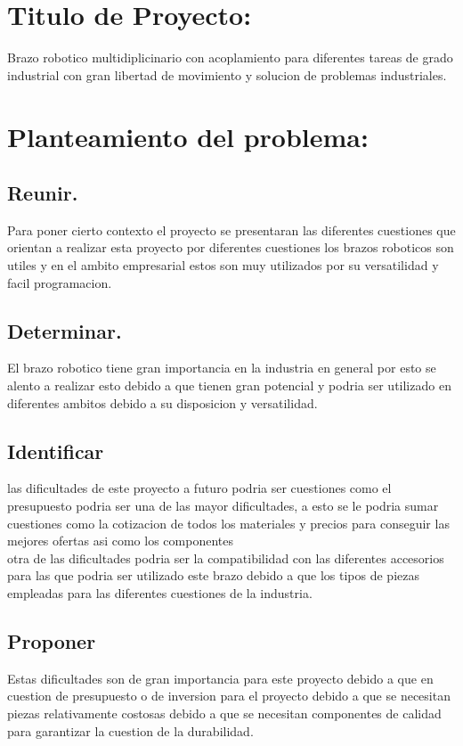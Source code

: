 \documentclass[14pt,a4paper]{article}
\begin{document}
\newpage

\section{Titulo de Proyecto:}

Brazo robotico multidiplicinario con acoplamiento para diferentes tareas de grado industrial con gran libertad de movimiento y solucion de problemas industriales.


\section{Planteamiento del problema:}

\subsection{Reunir.}
Para poner cierto contexto el proyecto se presentaran las diferentes cuestiones que orientan a realizar esta proyecto  por diferentes cuestiones los brazos roboticos son utiles y en el ambito empresarial estos son muy utilizados por su versatilidad y facil programacion.

\subsection{Determinar.}
El brazo robotico tiene gran importancia en la industria en general por esto se alento a realizar esto debido a que tienen gran potencial y podria ser utilizado en diferentes ambitos debido a su disposicion y versatilidad.

\subsection{Identificar}
las dificultades de este proyecto a futuro podria ser cuestiones como el presupuesto podria ser una de las mayor dificultades, a esto se le podria sumar cuestiones como la cotizacion de todos los materiales y precios para conseguir las mejores ofertas asi como los componentes\\
otra de las dificultades podria ser la compatibilidad con las diferentes accesorios para las que podria ser utilizado este brazo debido a que los tipos de piezas empleadas para las diferentes cuestiones de la industria. 

\subsection{Proponer}
Estas dificultades son de gran importancia para este proyecto debido a que en cuestion de presupuesto o de inversion para el proyecto debido a que se necesitan piezas relativamente costosas debido a que se necesitan componentes de calidad para garantizar la cuestion de la durabilidad.
\end{document}

